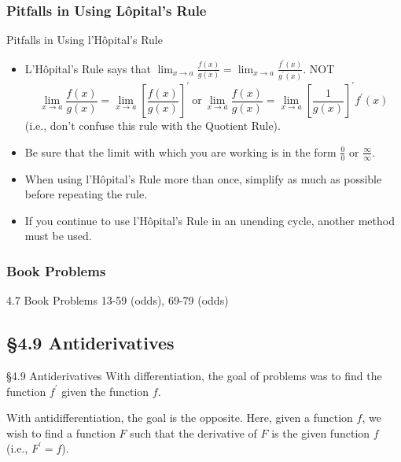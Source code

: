 \documentclass[cal1spr16Lectures.tex]{subfiles}
\begin{document}
\subsubsection{Pitfalls in Using L\^opital's Rule}

\begin{frame}{\small Pitfalls in Using l'H\^{o}pital's Rule}
\footnotesize
\begin{itemize}
\item[1.] L'H\^{o}pital's Rule says that $\displaystyle\lim_{x \to a}\frac{f(x)}{g(x)} = 
\displaystyle\lim_{x \to a}\frac{f^{\prime}(x)}{g^{\prime}(x)}$.  \alert{NOT} 
\[\lim_{x \to a}\frac{f(x)}{g(x)} = \lim_{x \to a}\left[ \frac{f(x)}{g(x)} \right]^{\prime}\ \text{or}\
\lim_{x \to a}\frac{f(x)}{g(x)} = \lim_{x \to a} \left[ \frac{1}{g(x)} \right]^{\prime} f^{\prime}(x)\]
(i.e., don't confuse this rule with the Quotient Rule).
\item[2.] Be sure that the limit with which you are working is in the form $\frac{0}{0}$ or $\frac{\infty}{\infty}$.
\item[3.] When using l'H\^{o}pital's Rule more than once, simplify as much as possible before repeating the rule.
\item[4.] If you continue to use l'H\^{o}pital's Rule in an unending cycle, another method must be used.
\end{itemize}
\end{frame}

\subsubsection{Book Problems}

\begin{frame}
\begin{block}{4.7 Book Problems}
13-59 (odds), 69-79 (odds)
\end{block}
\end{frame}

\subsection[4.9 Antiderivatives]{\S 4.9 Antiderivatives}\small

\begin{frame}{\S 4.9 Antiderivatives}\small
With differentiation, the goal of problems was to find the function $f^{\prime}$ given the function $f$.

\vspace{1pc}
With antidifferentiation, the goal is the opposite.  Here, given a function $f$, we wish to find a function $F$ such that the derivative of $F$ is the given function $f$ (i.e., $F^{\prime}=f$).
\end{frame}
\end{document}
